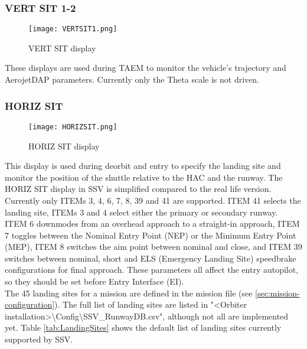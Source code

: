 \documentclass[Space_Shuttle_Vessel_Manual.tex]{subfiles}
\begin{document}
\begin{multicols*}{2}
\subsubsection{VERT SIT 1-2}
\begin{figure}[H]
  \texttt{[image: VERTSIT1.png]}
  \caption{VERT SIT display}
  \label{fig:VERT_SIT}
\end{figure}
These displays are used during TAEM to monitor the vehicle's trajectory and AerojetDAP parameters. Currently only the Theta scale is not driven.

\subsubsection{HORIZ SIT}
\begin{figure}[H]
  \texttt{[image: HORIZSIT.png]}
  \caption{HORIZ SIT display}
  \label{fig:HORIZ_SIT}
\end{figure}
This display is used during deorbit and entry to specify the landing site and monitor the position of the shuttle relative to the HAC and the runway.
The HORIZ SIT display in SSV is simplified compared to the real life version.
Currently only ITEMs 3, 4, 6, 7, 8, 39 and 41 are supported.
ITEM 41 selects the landing site, ITEMs 3 and 4 select either the primary or secondary runway. ITEM 6 downmodes from an overhead approach to a straight-in approach, ITEM 7 toggles between the Nominal Entry Point (NEP) or the Minimum Entry Point (MEP), ITEM 8 switches the aim point between nominal and close, and ITEM 39 switches between nominal, short and ELS (Emergency Landing Site) speedbrake configurations for final approach.
These parameters all affect the entry autopilot, so they should be set before Entry Interface (EI).\\
The 45 landing sites for a mission are defined in the mission file (see \ref{sec:mission-configuration}). The full list of landing sites are listed in "<Orbiter installation>\textbackslash Config\textbackslash SSV\_RunwayDB.csv", although not all are implemented yet. Table \ref{tab:LandingSites} shows the default list of landing sites currently supported by SSV.


\end{multicols*}
\end{document}
